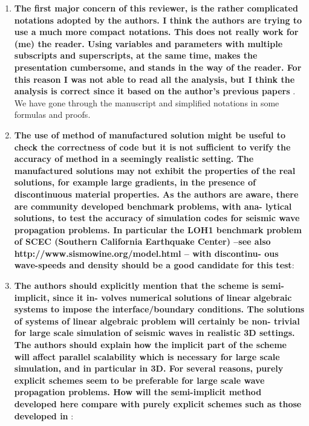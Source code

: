 \documentclass[twoside,11pt]{article}
\begin{document}
\begin{enumerate}
\item \textbf{The first major concern of this reviewer, is the rather complicated notations adopted by the authors. I think the authors are trying to use a much more compact notations. This does not really work for (me) the reader. Using variables and parameters with multiple subscripts and superscripts, at the same time, makes the presentation cumbersome, and stands in the way of the reader. For this reason I was not able to read all the analysis, but I think the analysis is correct since it based on the author’s previous papers} \cite{petersson2009stable,wang2019fourth,petersson2015wave}.\\
 We have gone through the manuscript and simplified notations in some formulas and proofs.

\item  \textbf{The use of method of manufactured solution might be useful to check the correctness of code but it is not sufficient to verify the accuracy of method in a seemingly realistic setting. The manufactured solutions may not exhibit the properties of the real solutions, for example large gradients, in the presence of discontinuous material properties. As the authors are aware, there are community developed benchmark problems, with ana- lytical solutions, to test the accuracy of simulation codes for seismic wave propagation problems. In particular the LOH1 benchmark problem of SCEC (Southern California Earthquake Center) –see also http://www.sismowine.org/model.html – with discontinu- ous wave-speeds and density should be a good candidate for this test}: 

\item  \textbf{The authors should explicitly mention that the scheme is semi-implicit, since it in- volves numerical solutions of linear algebraic systems to impose the interface/boundary conditions. The solutions of systems of linear algebraic problem will certainly be non- trivial for large scale simulation of seismic waves in realistic 3D settings. The authors should explain how the implicit part of the scheme will affect parallel scalability which is necessary for large scale simulation, and in particular in 3D. For several reasons, purely explicit schemes seem to be preferable for large scale wave propagation problems. How will the semi-implicit method developed here compare with purely explicit schemes such as those developed in} \cite{virta2014acoustic,duru2014stable}: 


\end{enumerate}
\end{document}
